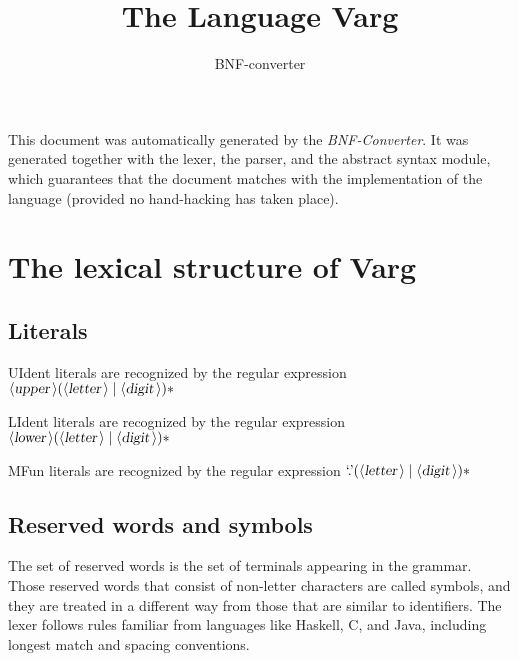 \documentclass[a4paper,11pt]{article}
\author{BNF-converter}
\title{The Language Varg}
\begin{document}
\maketitle

\newcommand{\emptyP}{\mbox{$\epsilon$}}
\newcommand{\terminal}[1]{\mbox{{\texttt {#1}}}}
\newcommand{\nonterminal}[1]{\mbox{$\langle \mbox{{\sl #1 }} \! \rangle$}}
\newcommand{\arrow}{\mbox{::=}}
\newcommand{\delimit}{\mbox{$|$}}
\newcommand{\reserved}[1]{\mbox{{\texttt {#1}}}}
\newcommand{\literal}[1]{\mbox{{\texttt {#1}}}}
\newcommand{\symb}[1]{\mbox{{\texttt {#1}}}}

This document was automatically generated by the {\em BNF-Converter}. It was generated together with the lexer, the parser, and the abstract syntax module, which guarantees that the document matches with the implementation of the language (provided no hand-hacking has taken place).

\section*{The lexical structure of Varg}

\subsection*{Literals}








UIdent literals are recognized by the regular expression
\({\nonterminal{upper}} ({\nonterminal{letter}} \mid {\nonterminal{digit}})*\)

LIdent literals are recognized by the regular expression
\({\nonterminal{lower}} ({\nonterminal{letter}} \mid {\nonterminal{digit}})*\)

MFun literals are recognized by the regular expression
\(\mbox{`.'} ({\nonterminal{letter}} \mid {\nonterminal{digit}})*\)


\subsection*{Reserved words and symbols}
The set of reserved words is the set of terminals appearing in the grammar. Those reserved words that consist of non-letter characters are called symbols, and they are treated in a different way from those that are similar to identifiers. The lexer follows rules familiar from languages like Haskell, C, and Java, including longest match and spacing conventions.
\end{document}
